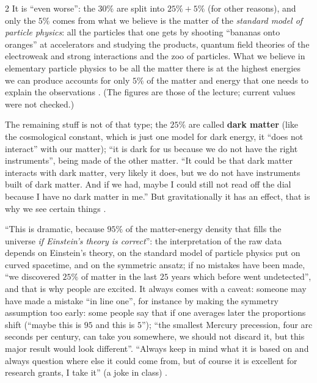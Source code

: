 \begin{paracol}{2}
It is ``even worse'': the $30\%$ are split into $25\%+5\%$ (for other reasons), and only the $5\%$ comes from what we believe is the matter of the \emph{standard model of particle physics}: all the particles that one gets by shooting ``bananas onto oranges'' at accelerators and studying the products, quantum field theories of the electroweak and strong interactions and the zoo of particles. What we believe in elementary particle physics to be all the matter there is at the highest energies we can produce accounts for only $5\%$ of the matter and energy that one needs to explain the observations . (The figures are those of the lecture; current values were not checked.)

The remaining stuff is not of that type; the $25\%$ are called \textbf{dark matter} (like the cosmological constant, which is just one model for dark energy, it ``does not interact'' with our matter); ``it is dark for us because we do not have the right instruments'', being made of the other matter. ``It could be that dark matter interacts with dark matter, very likely it does, but we do not have instruments built of dark matter. And if we had, maybe I could still not read off the dial because I have no dark matter in me.'' But gravitationally it has an effect, that is why we see certain things .

\begin{coursenote}
``This is dramatic, because $95\%$ of the matter-energy density that fills the universe \emph{if Einstein's theory is correct}'': the interpretation of the raw data depends on Einstein's theory, on the standard model of particle physics put on curved spacetime, and on the symmetric ansatz; if no mistakes have been made, ``we discovered $25\%$ of matter in the last $25$ years which before went undetected'', and that is why people are excited. It always comes with a caveat: someone may have made a mistake ``in line one'', for instance by making the symmetry assumption too early: some people say that if one averages later the proportions shift (``maybe this is $95$ and this is $5$''); ``the smallest Mercury precession, four arc seconds per century, can take you somewhere, we should not discard it, but this major result would look different''. ``Always keep in mind what it is based on and always question where else it could come from, but of course it is excellent for research grants, I take it'' (a joke in class) .
\end{coursenote}


\end{paracol}
